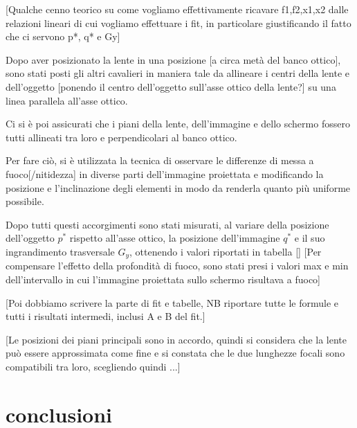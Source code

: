 \documentclass{article}
\begin{document}
[Qualche cenno teorico su come vogliamo effettivamente ricavare f1,f2,x1,x2 dalle relazioni lineari di cui vogliamo effettuare i fit, in particolare giustificando il fatto che ci servono p*, q* e Gy]

Dopo aver posizionato la lente in una posizione [a circa metà del banco ottico], sono stati posti gli altri cavalieri in maniera tale da allineare i centri della lente e dell'oggetto [ponendo il centro dell'oggetto sull'asse ottico della lente?] su una linea parallela all'asse ottico.

Ci si è poi assicurati che i piani della lente, dell'immagine e dello schermo fossero tutti allineati tra loro e perpendicolari al banco ottico.

Per fare ciò, si è utilizzata la tecnica di osservare le differenze di messa a fuoco[/nitidezza] in diverse parti dell'immagine proiettata e modificando la posizione e l'inclinazione degli elementi in modo da renderla quanto più uniforme possibile.

Dopo tutti questi accorgimenti sono stati misurati, al variare della posizione dell'oggetto $p^*$ rispetto all'asse ottico, la posizione dell'immagine $q^*$ e il suo ingrandimento trasversale $G_y$, ottenendo i valori riportati in tabella []
[Per compensare l'effetto della profondità di fuoco, sono stati presi i valori max e min dell'intervallo in cui l'immagine proiettata sullo schermo risultava a fuoco]

[Poi dobbiamo scrivere la parte di fit e tabelle, 
NB riportare tutte le formule e tutti i risultati intermedi, inclusi A e B del fit.]

[Le posizioni dei piani principali sono in accordo, quindi si considera che la lente può essere approssimata come fine e si constata che le due lunghezze focali sono compatibili tra loro, scegliendo quindi ...]


\section{conclusioni}
\end{document}
